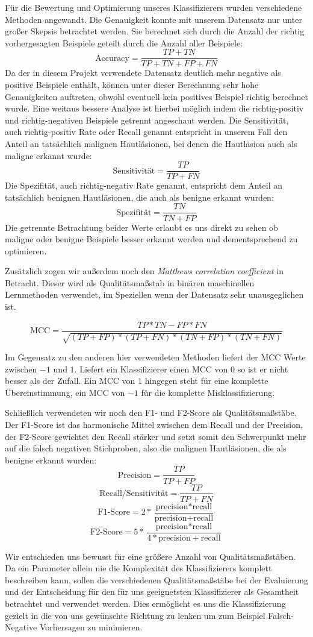 Für die Bewertung und Optimierung unseres Klassifizierers wurden verschiedene Methoden angewandt. Die Genauigkeit konnte mit unserem Datensatz nur unter großer Skepsis betrachtet werden. Sie berechnet sich durch die Anzahl der richtig vorhergesagten Beispiele geteilt durch die Anzahl aller Beispiele:
	\[\text{Accuracy} = \frac{TP+TN}{TP+TN+FP+FN}\]
Da der in diesem Projekt verwendete Datensatz deutlich mehr negative als positive Beispiele enthält, können unter dieser Berechnung sehr hohe Genauigkeiten auftreten, obwohl eventuell kein positives Beispiel richtig berechnet wurde. Eine weitaus bessere Analyse ist hierbei möglich indem die richtig-positiv und richtig-negativen Beispiele getrennt angeschaut werden. Die Sensitivität, auch richtig-positiv Rate oder Recall genannt entspricht in unserem Fall den Anteil an tatsächlich malignen Hautläsionen, bei denen die Hautläsion auch als maligne erkannt wurde: 
\[\text{Sensitivität} = \frac{TP}{TP+FN}\]
Die Spezifität, auch richtig-negativ Rate genannt, entspricht dem Anteil an tatsächlich benignen Hautläsionen, die auch als benigne erkannt wurden:
\[\text{Spezifität} = \frac{TN}{TN+FP}\]
Die getrennte Betrachtung beider Werte erlaubt es uns direkt zu sehen ob maligne oder benigne Beispiele besser erkannt werden und dementsprechend zu optimieren.

Zusätzlich zogen wir außerdem noch den \textit{Matthews correlation coefficient} in Betracht. Dieser wird als Qualitätsmaßstab in binären maschinellen Lernmethoden verwendet, im Speziellen wenn der Datensatz sehr unausgeglichen ist. 

\[\text{MCC} = \frac{TP*TN - FP*FN}{\sqrt{(TP+FP)*(TP+FN)*(TN+FP)*(TN+FN)}}\]

Im Gegensatz zu den anderen hier verwendeten Methoden liefert der MCC Werte zwischen $-1$ und $1$. Liefert ein Klassifizierer einen MCC von $0$ so ist er nicht besser als der Zufall. Ein MCC von $1$ hingegen steht für eine komplette Übereinstimmung, ein MCC von $-1$ für die komplette Misklassifizierung.

Schließlich verwendeten wir noch den F1- und F2-Score als Qualitätsmaßstäbe. Der F1-Score ist das harmonische Mittel zwischen dem Recall und der Precision, der F2-Score gewichtet den Recall stärker und setzt somit den Schwerpunkt mehr auf die falsch negativen Stichproben, also die malignen Hautläsionen, die als benigne erkannt wurden:
	\[\text{Precision} = \frac{TP}{TP+FP}\]
    \[\text{Recall/Sensitivität} = \frac{TP}{TP+FN}\]
	\[\text{F1-Score} = 2*\frac{\text{precision}*\text{recall}}	{\text{precision}+\text{recall}}\]
   	\[\text{F2-Score} = 5*\frac{\text{precision}*\text{recall}}	{4*\text{precision}+\text{recall}}\]
    
Wir entschieden uns bewusst für eine größere Anzahl von Qualitätsmaßstäben. Da ein Parameter allein nie die Komplexität des Klassifizierers komplett beschreiben kann, sollen die verschiedenen Qualitätsmaßstäbe bei der Evaluierung und der Entscheidung für den für uns geeignetsten Klassifizierer als Gesamtheit betrachtet und verwendet werden. Dies ermöglicht es uns die Klassifizierung gezielt in die von uns gewünschte Richtung zu lenken um zum Beispiel Falsch-Negative Vorhersagen zu minimieren.
